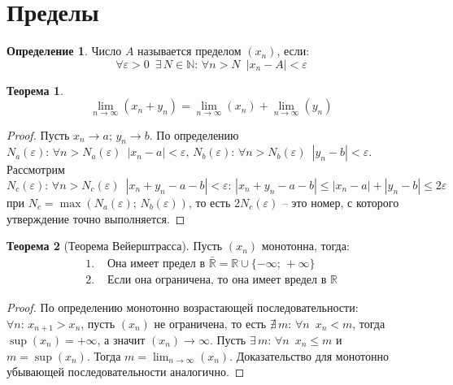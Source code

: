 \documentclass[12pt]{article}
\theoremstyle{definition}
\newtheorem{theorem}{Теорема}[section]
\newtheorem{definition}{Определение}
\newcommand{\N}{\mathbb{N}}
\newcommand{\R}{\mathbb{R}}
\begin{document}
\section{Пределы}
\begin{definition}
    Число $A$ называется пределом $(x_n)$, если:
    $$\forall \varepsilon >0\,\,\,\exists\,N\in\N:\,\forall n>N\,\,\,|x_n-A|<\varepsilon$$
\end{definition}
\begin{theorem}
    $$\lim_{n\to\infty}(x_n+y_n)=\lim_{n\to\infty}(x_n)+\lim_{n\to\infty}(y_n)$$
\end{theorem}
\begin{proof}
    Пусть $x_n\to a;\,y_n\to b$. По определению $N_a(\varepsilon):\,\forall n>N_a(\varepsilon)\,\,\,|x_n-a|<\varepsilon,\,N_b(\varepsilon):\,\forall n>N_b(\varepsilon)\,\,\,|y_n-b|<\varepsilon$. Рассмотрим $N_c(\varepsilon):\,\forall n>N_c(\varepsilon)\,\,\,|x_n+y_n-a-b|<\varepsilon:\,|x_n+y_n-a-b|\leq|x_n-a|+|y_n-b|\leq 2\varepsilon$ при $N_c=\max(N_a(\varepsilon);\,N_b(\varepsilon))$, то есть $2N_c(\varepsilon)$ -- это номер, с которого утверждение точно выполняется.
\end{proof}
\begin{theorem}[Теорема Вейерштрасса]
    Пусть $(x_n)$ монотонна, тогда:
    \begin{align*}
        1.\,\,&\text{Она имеет предел в }\bar{\R}=\R\cup\{-\infty;\,+\infty\}\\
        2.\,\,&\text{Если она ограничена, то она имеет вредел в }\R
    \end{align*}
\end{theorem}
\begin{proof}
    По определению монотонно возрастающей последовательности: $\forall n:\, x_{n+1}>x_n$, пусть $(x_n)$ не ограничена, то есть $\nexists\,m:\,\forall n\,\,\,x_n<m$, тогда $\sup(x_n)=+\infty$, а значит $(x_n)\to \infty$. Пусть $\exists\,m:\,\forall n \,\,\,x_n\leq m$ и $m=\sup(x_n)$. Тогда $m=\lim_{n\to\infty}(x_n)$. Доказательство для монотонно убывающей последовательности аналогично.
\end{proof}
\end{document}
